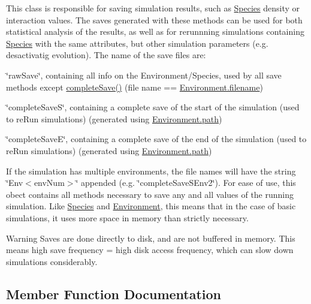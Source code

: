 This class is responsible for saving simulation results, such as \hyperlink{classSpecies}{Species} density or interaction values. The saves generated with these methods can be used for both statistical analysis of the results, as well as for rerunnning simulations containing \hyperlink{classSpecies}{Species} with the same attributes, but other simulation parameters (e.\+g. desactivatig evolution). The name of the save files are\+:
\begin{DoxyItemize}
\item \char`\"{}raw\+Save\char`\"{}, containing all info on the Environment/\+Species, used by all save methods except \hyperlink{classSave_a479ae37320e8aaaa98a5636071fb9c59}{complete\+Save()} (file name == \hyperlink{classEnvironment_afefeccf87332c116006372e3ee197452}{Environment.\+filename})
\item \char`\"{}complete\+Save\+S\char`\"{}, containing a complete save of the start of the simulation (used to re\+Run simulations) (generated using \hyperlink{classEnvironment_a27a1684288d74f2cabb8cfbd0848b14e}{Environment.\+path})
\item \char`\"{}complete\+Save\+E\char`\"{}, containing a complete save of the end of the simulation (used to re\+Run simulations) (generated using \hyperlink{classEnvironment_a27a1684288d74f2cabb8cfbd0848b14e}{Environment.\+path})
\end{DoxyItemize}

If the simulation has multiple environments, the file names will have the string \char`\"{}\+Env$<$env\+Num$>$\char`\"{} appended (e.\+g. \char`\"{}complete\+Save\+S\+Env2\char`\"{}). For ease of use, this obect contains all methods necessary to save any and all values of the running simulation. Like \hyperlink{classSpecies}{Species} and \hyperlink{classEnvironment}{Environment}, this means that in the case of basic simulations, it uses more space in memory than strictly necessary.

\begin{DoxyWarning}{Warning}
Saves are done directly to disk, and are not buffered in memory. This means high save frequency = high disk access frequency, which can slow down simulations considerably. 
\end{DoxyWarning}


\subsection{Member Function Documentation}
\hypertarget{classSave_a479ae37320e8aaaa98a5636071fb9c59}{}\label{classSave_a479ae37320e8aaaa98a5636071fb9c59} 
